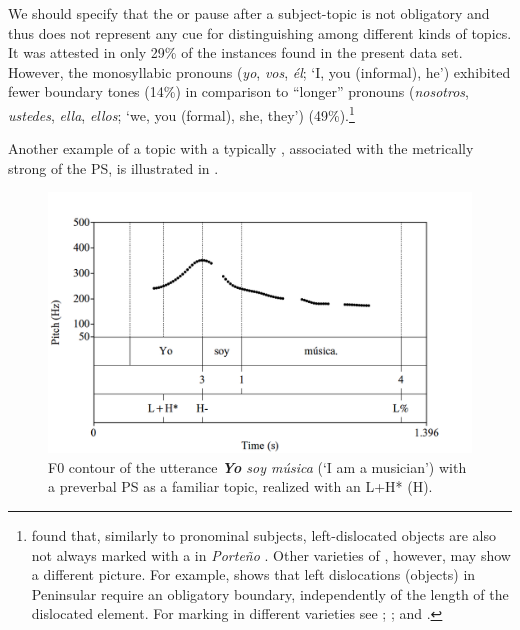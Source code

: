 \documentclass[output=paper]{langsci/langscibook}
\begin{document}
  We should specify that the  or pause after a subject-topic is not obligatory and thus does not represent any cue for distinguishing among different kinds of topics. It was attested in only 29\% of the instances found in the present data set. However, the monosyllabic pronouns (\textit{yo}, \textit{vos}, \textit{él}; ‘I, you (informal), he’) exhibited fewer boundary tones (14\%) in comparison to ``longer'' pronouns (\textit{nosotros}, \textit{ustedes}, \textit{ella}, \textit{ellos}; ‘we, you (formal), she, they’) (49\%).\footnote{\citet{Feldhausen2010bantu} found that, similarly to pronominal subjects, left-dislocated objects are also not always marked with a  in \textit{Porte{\~n}o} . Other varieties of , however, may show a different picture. For example, \citet{Feldhausen2016} shows that left dislocations (objects) in Peninsular  require an obligatory boundary, independently of the length of the dislocated element. For  marking in different  varieties see \citet{DImperio2005}; \citet{Frota2007}; and \citet{Feldhausen2010nequen}.}

Another example of a topic with a typically , associated with the metrically strong  of the PS, is illustrated in .\largerpage[2]

  
\begin{figure}[H]
\includegraphics[width=.9\textwidth]{figures/pes-img14.png}
\caption{F0 contour of the utterance \textit{\textbf{Yo} soy música} (‘I am a musician’) with a preverbal PS as a familiar topic, realized with an L+H* (H\textminus{}).\label{fig:pes:14}}
\end{figure}\clearpage
\end{document}
